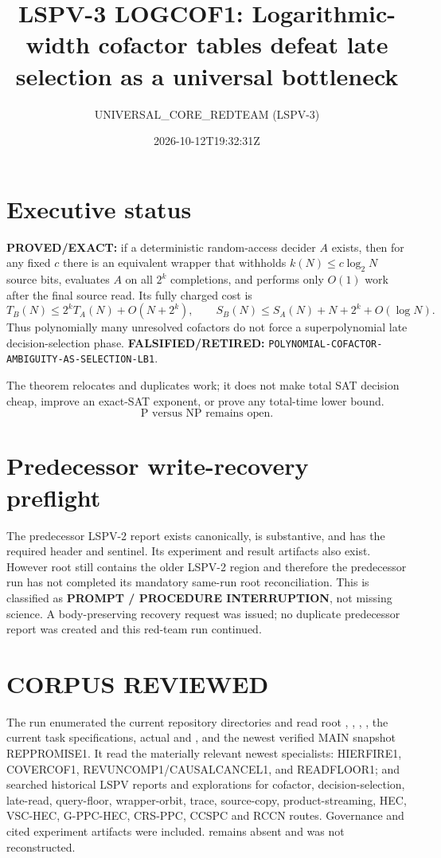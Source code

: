 \documentclass[11pt]{article}
\title{LSPV-3 LOGCOF1: Logarithmic-width cofactor tables defeat late selection as a universal bottleneck}
\author{UNIVERSAL\_CORE\_REDTEAM (LSPV-3)}
\date{2026-10-12T19:32:31Z}
\newcommand{\Status}[1]{\textbf{#1}}
\begin{document}
\maketitle

\section*{Executive status}
\Status{PROVED/EXACT:} if a deterministic random-access decider \(A\) exists,
then for any fixed \(c\) there is an equivalent wrapper that withholds
\(k(N)\le c\log_2 N\) source bits, evaluates \(A\) on all \(2^k\) completions,
and performs only \(O(1)\) work after the final source read. Its fully charged
cost is
\[
 T_B(N)\le 2^kT_A(N)+O(N+2^k),\qquad
 S_B(N)\le S_A(N)+N+2^k+O(\log N).
\]
Thus polynomially many unresolved cofactors do not force a superpolynomial
late decision-selection phase. \Status{FALSIFIED/RETIRED:}
\texttt{POLYNOMIAL-COFACTOR-AMBIGUITY-AS-SELECTION-LB1}.

The theorem relocates and duplicates work; it does not make total SAT decision
cheap, improve an exact-SAT exponent, or prove any total-time lower bound.
\[
 \boxed{\text{P versus NP remains open.}}
\]

\section{Predecessor write-recovery preflight}
The predecessor LSPV-2 report
exists canonically, is substantive, and has the required header and sentinel.
Its experiment and result artifacts also exist. However root 
still contains the older LSPV-2 region and therefore the predecessor run has
not completed its mandatory same-run root reconciliation. This is classified
as \Status{PROMPT / PROCEDURE INTERRUPTION}, not missing science. A
body-preserving recovery request was issued; no duplicate predecessor report
was created and this red-team run continued.

\section{CORPUS REVIEWED}
The run enumerated the current repository directories and read root
, , ,
, the current task specifications,
actual  and , and the newest verified MAIN
snapshot REPPROMISE1. It read the materially relevant newest specialists:
HIERFIRE1, COVERCOF1, REVUNCOMP1/CAUSALCANCEL1, and READFLOOR1; and searched
historical LSPV reports and explorations for cofactor, decision-selection,
late-read, query-floor, wrapper-orbit, trace, source-copy, product-streaming,
HEC, VSC-HEC, G-PPC-HEC, CRS-PPC, CCSPC and RCCN routes. Governance and cited
experiment artifacts were included. 
remains absent and was not reconstructed.
\end{document}
